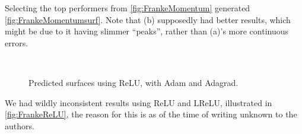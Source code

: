 \documentclass{article}
\theoremstyle{definition}
\begin{document}
Selecting the top performers from \autoref{fig:FrankeMomentum} generated \autoref{fig:FrankeMomentumsurf}. Note that (b) supposedly had better results, which might be due to it having slimmer ``peaks'', rather than (a)'s more continuous errors.

\begin{figure}[H]%
    \centering
    \\
    \caption{Predicted surfaces using ReLU, with Adam and Adagrad.}%
    \label{fig:FrankeReLU}%
\end{figure}

We had wildly inconsistent results using ReLU and LReLU, illustrated in \autoref{fig:FrankeReLU}, the reason for this is as of the time of writing unknown to the authors.
\end{document}
